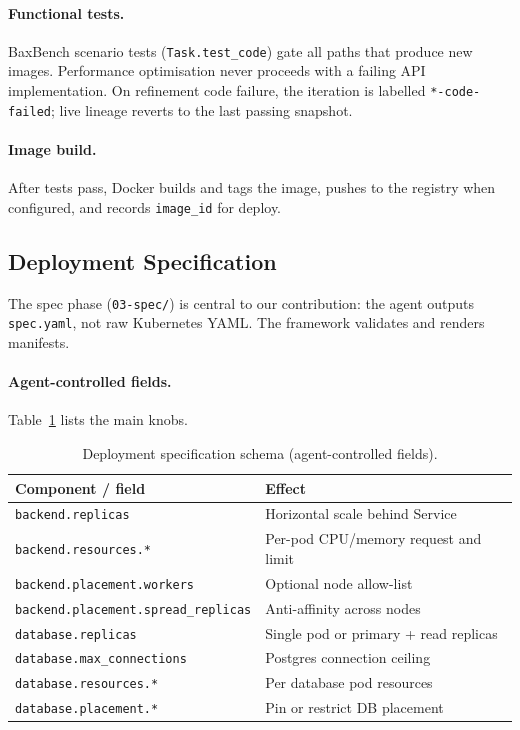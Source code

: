 \paragraph{Functional tests.}
BaxBench scenario tests (\texttt{Task.test\_code}) gate all paths that produce
new images.  Performance optimisation never proceeds with a failing API
implementation.  On refinement code failure, the iteration is labelled
\texttt{*-code-failed}; live lineage reverts to the last passing snapshot.

\paragraph{Image build.}
After tests pass, Docker builds and tags the image, pushes to the registry when
configured, and records \texttt{image\_id} for deploy.


\subsection{Deployment Specification}
\label{sec:methods-spec}

The spec phase (\texttt{03-spec/}) is central to our contribution: the agent
outputs \texttt{spec.yaml}, not raw Kubernetes YAML.  The framework validates
and renders manifests.

\paragraph{Agent-controlled fields.}
Table~\ref{tab:spec-schema} lists the main knobs.

\begin{table}[t]
  \centering
  \caption{Deployment specification schema (agent-controlled fields).}
  \label{tab:spec-schema}
  \small
  \begin{tabular}{@{}ll@{}}
    \toprule
    \textbf{Component / field} & \textbf{Effect} \\
    \midrule
    \texttt{backend.replicas} & Horizontal scale behind Service \\
    \texttt{backend.resources.*} & Per-pod CPU/memory request and limit \\
    \texttt{backend.placement.workers} & Optional node allow-list \\
    \texttt{backend.placement.spread\_replicas} & Anti-affinity across nodes \\
    \texttt{database.replicas} & Single pod or primary + read replicas \\
    \texttt{database.max\_connections} & Postgres connection ceiling \\
    \texttt{database.resources.*} & Per database pod resources \\
    \texttt{database.placement.*} & Pin or restrict DB placement \\
    \bottomrule
  \end{tabular}
\end{table}

